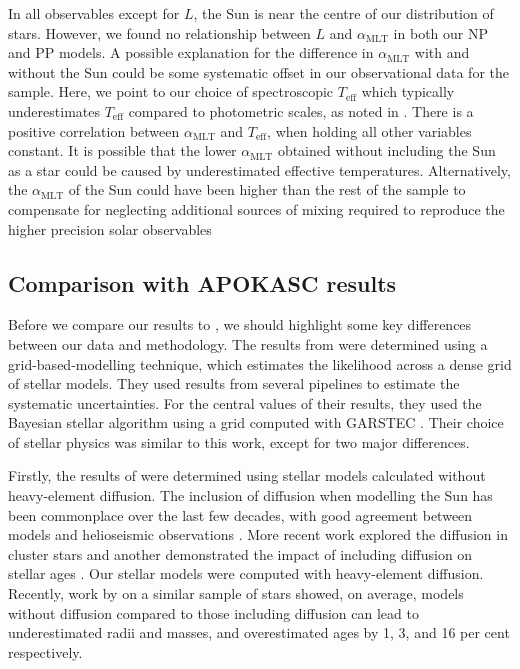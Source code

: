\documentclass[a4paper,fleqn,usenatbib]{mnras}
\newcommand{\teff}{\ensuremath{T_\mathrm{eff}}}
\newcommand{\mlt}{\ensuremath{{\alpha_\mathrm{MLT}}}}
\begin{document}
In all observables except for $L$, the Sun is near the centre of our distribution of stars. However, we found no relationship between $L$ and $\mlt$ in both our NP and PP models. A possible explanation for the difference in $\mlt$ with and without the Sun could be some systematic offset in our observational data for the sample. Here, we point to our choice of spectroscopic $\teff$ which typically underestimates $\teff$ compared to photometric scales, as noted in . There is a positive correlation between $\mlt$ and $\teff$, when holding all other variables constant. It is possible that the lower $\mlt$ obtained without including the Sun as a star could be caused by underestimated effective temperatures. Alternatively, the $\mlt$ of the Sun could have been higher than the rest of the sample to compensate for neglecting additional sources of mixing required to reproduce the higher precision solar observables

\subsection{Comparison with APOKASC results}\label{sec:comp}

Before we compare our results to , we should highlight some key differences between our data and methodology. The results from  were determined using a grid-based-modelling technique, which estimates the likelihood across a dense grid of stellar models. They used results from several pipelines to estimate the systematic uncertainties. For the central values of their results, they used the Bayesian stellar algorithm \citep[BASTA;][]{SilvaAguirre.Davies.ea2015} using a grid computed with \textsc{GARSTEC} \citep{Weiss.Schlattl2008}. Their choice of stellar physics was similar to this work, except for two major differences.

Firstly, the results of  were determined using stellar models calculated without heavy-element diffusion. The inclusion of diffusion when modelling the Sun has been commonplace over the last few decades, with good agreement between models and helioseismic observations \citep{Christensen-Dalsgaard.Proffitt.ea1993, Bahcall.Pinsonneault.ea1995}. More recent work explored the diffusion in cluster stars \citep{Korn.Grundahl.ea2007, Onehag.Gustafsson.ea2014} and another demonstrated the impact of including diffusion on stellar ages \citep{Dotter.Conroy.ea2017}. Our stellar models were computed with heavy-element diffusion. Recently, work by \citet{Nsamba.Campante.ea2018} on a similar sample of stars showed, on average, models without diffusion compared to those including diffusion can lead to underestimated radii and masses, and overestimated ages by 1, 3, and 16 per cent respectively.
\end{document}
